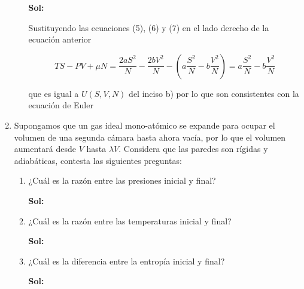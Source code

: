 \documentclass[12pt,a4paper]{article}
\begin{document}
\begin{enumerate}
\begin{enumerate}
    \textbf{Sol:}
    
    Sustituyendo las ecuaciones (5), (6) y (7) en el lado derecho de la ecuación anterior
    
    \begin{equation}
        TS - PV + \mu N = \frac{2aS^2}{N} - \frac{2bV^2}{N} - \left(a\frac{S^2}{N} - b \frac{V^2}{N} \right) = a\frac{S^2}{N} - b \frac{V^2}{N} 
    \end{equation}
    
    que es igual a $U(S,V,N)$ del inciso b) por lo que son consistentes con la ecuación de Euler
\end{enumerate}

\item Supongamos que un gas ideal mono-atómico se expande para ocupar el volumen de una segunda cámara hasta ahora vacía, por lo que el volumen aumentará desde $V$ hasta $\lambda V$. Considera que las paredes son rígidas y adiabáticas, contesta las siguientes preguntas:

\begin{enumerate}
    \item ¿Cuál es la razón entre las presiones inicial y final?
    
    \textbf{Sol:}
    
    \item ¿Cuál es la razón entre las temperaturas inicial y final?
    
    \textbf{Sol:}
    
    \item ¿Cuál es la diferencia entre la entropía inicial y final?
    
    \textbf{Sol:}
    
\end{enumerate}
\end{enumerate}
\end{document}
